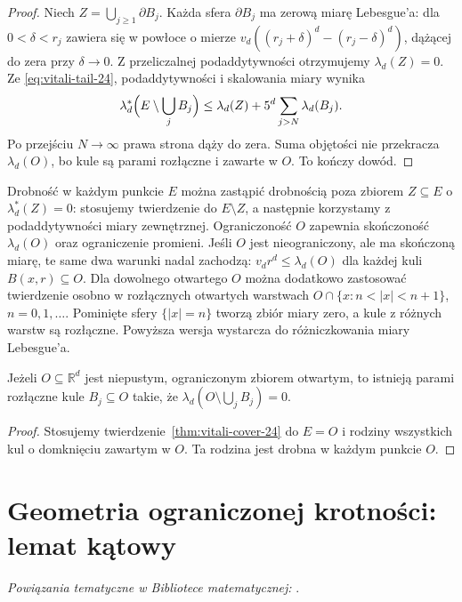 \begin{proof}
Niech $Z=\bigcup_{j\ge1}\partial B_j$.
Każda sfera $\partial B_j$ ma zerową miarę Lebesgue'a:
dla $0<\delta<r_j$ zawiera się w powłoce o mierze
$v_d((r_j+\delta)^d-(r_j-\delta)^d)$, dążącej do zera
przy $\delta\to0$. Z przeliczalnej podaddytywności
otrzymujemy $\lambda_d(Z)=0$.
Ze \eqref{eq:vitali-tail-24}, podaddytywności i skalowania
miary wynika
\[
 \lambda_d^*\Bigl(E\setminus\bigcup_jB_j\Bigr)
 \le\lambda_d(Z)+5^d\sum_{j>N}\lambda_d(B_j).
\]
Po przejściu $N\to\infty$ prawa strona dąży do zera.
Suma objętości nie przekracza $\lambda_d(O)$, bo kule są
parami rozłączne i zawarte w $O$. To kończy dowód.
\end{proof}

\begin{uwaga}
Drobność w każdym punkcie $E$ można zastąpić drobnością
poza zbiorem $Z\subseteq E$ o $\lambda_d^*(Z)=0$:
stosujemy twierdzenie do $E\setminus Z$, a następnie
korzystamy z podaddytywności miary zewnętrznej.
Ograniczoność $O$ zapewnia skończoność $\lambda_d(O)$
oraz ograniczenie promieni. Jeśli $O$ jest nieograniczony,
ale ma skończoną miarę, te same dwa warunki nadal zachodzą:
$v_dr^d\le\lambda_d(O)$ dla każdej kuli $B(x,r)\subseteq O$.
Dla dowolnego otwartego $O$ można dodatkowo zastosować
twierdzenie osobno w rozłącznych otwartych warstwach
$O\cap\{x:n<|x|<n+1\}$, $n=0,1,\ldots$.
Pominięte sfery $\{|x|=n\}$ tworzą zbiór miary zero,
a kule z różnych warstw są rozłączne. Powyższa wersja
wystarcza do różniczkowania miary Lebesgue'a.
\end{uwaga}

\begin{wniosek}
\label{cor:vitali-open-24}
Jeżeli $O\subseteq\mathbb R^d$ jest niepustym,
ograniczonym zbiorem otwartym, to istnieją parami rozłączne
kule $B_j\subseteq O$ takie, że
$\lambda_d(O\setminus\bigcup_jB_j)=0$.
\end{wniosek}
\begin{proof}
Stosujemy twierdzenie~\ref{thm:vitali-cover-24} do $E=O$
i rodziny wszystkich kul o domknięciu zawartym w $O$.
Ta rodzina jest drobna w każdym punkcie $O$.
\end{proof}

\section{Geometria ograniczonej krotności: lemat kątowy}

\noindent\emph{Powiązania tematyczne w Bibliotece matematycznej:} .

